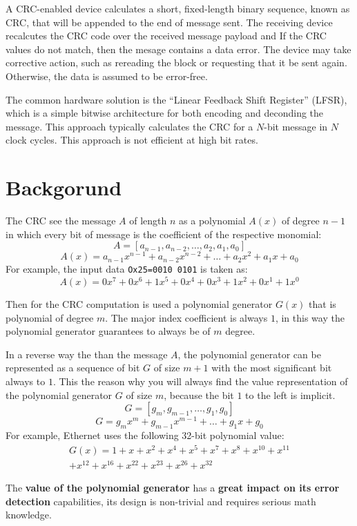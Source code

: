 \documentclass[fleqn]{IEEEtran}
\begin{document}
A CRC-enabled device calculates a short, fixed-length binary sequence, known 
as CRC, that will be appended to the end of message sent. The receiving device 
recalcutes the CRC code over the received message payload and If the CRC 
values do not match, then the mesage contains a 
data error. The device may take corrective action, such as rereading the block 
or requesting that it be sent again. Otherwise, the data is assumed to 
be error-free.

The common hardware solution is the “Linear Feedback Shift Register” (LFSR), 
which is a simple bitwise architecture for both encoding and deconding the 
message. This approach typically calculates the CRC for a $N$-bit message in 
$N$ clock cycles. This approach is not efficient at high bit rates.


\section{Backgorund}
The CRC see the message $A$ of length $n$ as a polynomial $A(x)$ of degree $n-1$
in which every bit of message is the coefficient of the respective monomial:
\[
   A=[a_{n-1},a_{n-2},\dots{},a_{2},a_{1},a_{0}]
\]
\[
   A(x)=a_{n-1}x^{n-1}+a_{n-2}x^{n-2}+\dots{}+a_{2}x^{2}+a_{1}x+a_{0}
\]
For example, the input data \verb|Ox25=0010 0101| is taken as:
\[
   A(x)=0x^{7}+0x^{6}+1x^{5}+0x^{4}+0x^{3}+1x^{2}+0x^{1}+1x^{0}
\]

Then for the CRC computation is used a polynomial generator $G(x)$ that is 
polynomial of degree $m$. The major index coefficient is always $1$, in this 
way the polynomial generator guarantees to always be of $m$ degree. 

In a reverse way the than the message $A$, the polynomial generator can be 
represented as a sequence of bit $G$ of size $m+1$ with the most significant bit 
always to $1$. This the reason why you will always find the value representation 
of the polynomial generator $G$ of size $m$, because the bit $1$ to the left is 
implicit.
\[
   G=[g_{m},g_{m-1},\dots{},g_{1},g_{0}] 
\]
\[
   G=g_{m}x^{m}+g_{m-1}x^{m-1}+\dots{}+g_{1}x+g_{0}
\]
For example, Ethernet uses the following 32-bit polynomial value:
\begin{gather*}
   G(x)=1+x+x^{2}+x^{4}+x^{5}+x^{7}+x^{8}+x^{10}+x^{11} \\
   +x^{12}+x^{16}+x^{22}+x^{23}+x^{26}+x^{32}
\end{gather*}

The \textbf{value of the polynomial generator} has a 
\textbf{great impact on its error detection} capabilities, its design is 
non-trivial and requires serious math knowledge.
\end{document}
